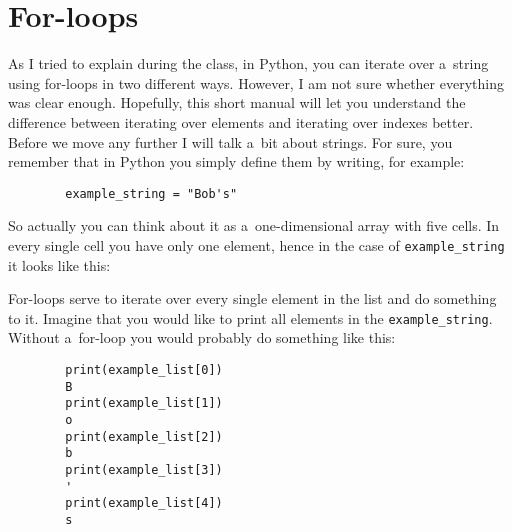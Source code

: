 \documentclass{article}
\begin{document}
\section*{For-loops}
As I tried to explain during the class, in Python, you can iterate over a~string using for-loops in two different ways. However, I am not sure whether everything was clear enough. Hopefully, this short manual will let you understand the difference between iterating over elements and iterating over indexes better. Before we move any further I will talk a~bit about strings. For sure, you remember that in Python you simply define them by writing, for example: 
\begin{center}
    \begin{verbatim}
        example_string = "Bob's"
    \end{verbatim}
\end{center}
    
\noindent So actually you can think about it as a~one-dimensional array with five cells. In every single cell you have only one element, hence in the case of \texttt{example_string} it looks like this:
\begin{center}
\end{center}
\noindent For-loops serve to iterate over every single element in the list and do something to it. Imagine that you would like to print all elements in the \texttt{example_string}. Without a~for-loop you would probably do something like this:

\begin{center}
    \begin{verbatim}
        print(example_list[0])
        B
        print(example_list[1])
        o
        print(example_list[2])
        b
        print(example_list[3])
        '
        print(example_list[4])
        s
    \end{verbatim}
\end{center}
\end{document}

